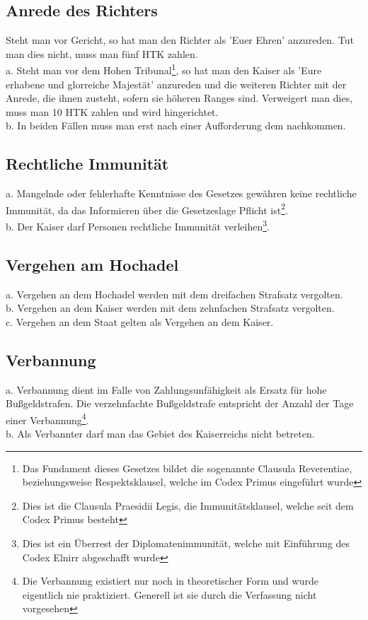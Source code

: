 \documentclass{article}
\begin{document}
\subsection{Anrede des Richters}
Steht man vor Gericht, so hat man den Richter als 'Euer Ehren' anzureden. Tut man dies nicht, muss man fünf HTK zahlen.\\
a. Steht man vor dem Hohen Tribunal\footnote{Das Fundament dieses Gesetzes bildet die sogenannte Clausula Reverentiae, beziehungsweise Respektsklausel, welche im Codex Primus eingeführt wurde}, so hat man den Kaiser als 'Eure erhabene und glorreiche Majestät' anzureden und die weiteren Richter mit der Anrede, die ihnen zusteht, sofern sie höheren Ranges sind. Verweigert man dies, muss man 10 HTK zahlen und wird hingerichtet.\\
b. In beiden Fällen muss man erst nach einer Aufforderung dem nachkommen.

\subsection{Rechtliche Immunität}
a. Mangelnde oder fehlerhafte Kenntnisse des Gesetzes gewähren keine rechtliche Immunität, da das Informieren über die Gesetzeslage Pflicht ist\footnote{Dies ist die Clausula Praesidii Legis, die Immunitätsklausel, welche seit dem Codex Primus besteht}.\\
b. Der Kaiser darf Personen rechtliche Immunität verleihen\footnote{Dies ist ein Überrest der Diplomatenimmunität, welche mit Einführung des Codex Elnirr abgeschafft wurde}.

\subsection{Vergehen am Hochadel}\label{vergehen}
a. Vergehen an dem Hochadel werden mit dem dreifachen Strafsatz vergolten.\\
b. Vergehen an dem Kaiser werden mit dem zehnfachen Strafsatz vergolten.\\
c. Vergehen an dem Staat gelten als Vergehen an dem Kaiser.

\subsection{Verbannung}
a. Verbannung dient im Falle von Zahlungsunfähigkeit als Ersatz für hohe Bußgeldstrafen. Die verzehnfachte Bußgeldstrafe entspricht der Anzahl der Tage einer Verbannung\footnote{Die Verbannung existiert nur noch in theoretischer Form und wurde eigentlich nie praktiziert. Generell ist sie durch die Verfassung nicht vorgesehen}.\\
b. Als Verbannter darf man das Gebiet des Kaiserreichs nicht betreten.
\end{document}
